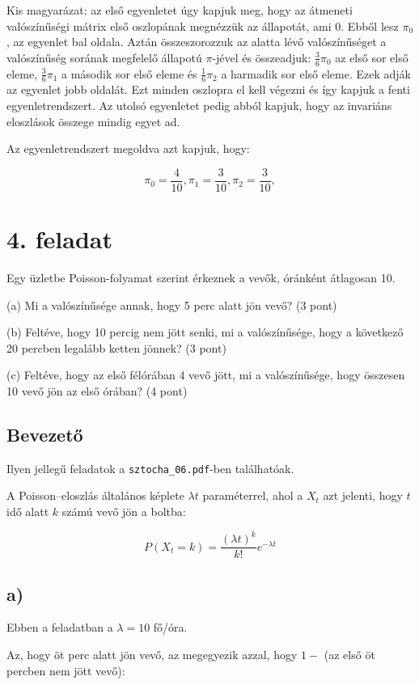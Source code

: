 \documentclass[a4paper,12pt]{article}   		%
\begin{document}
Kis magyarázat: az első egyenletet úgy kapjuk meg, hogy az átmeneti
valószínűségi mátrix első oszlopának megnézzük az állapotát, ami 0.
Ebből lesz $\pi_0$, az egyenlet bal oldala. Aztán összeszorozzuk az 
alatta lévő valószínűséget a valószínűség sorának megfelelő állapotú
$\pi$-jével és összeadjuk: $\frac{3}{6} \pi_0$ az első sor első eleme,
$\frac{3}{6} \pi_1$ a második sor első eleme és $\frac{1}{6} \pi_2$
a harmadik sor első eleme. Ezek adják az egyenlet jobb oldalát.
Ezt minden oszlopra el kell végezni és így kapjuk a fenti 
egyenletrendszert. Az utolsó egyenletet pedig abból kapjuk, hogy az
invariáns eloszlások összege mindig egyet ad.

Az egyenletrendszert megoldva azt kapjuk, hogy:

\[
\pi_0 = \frac{4}{10},
\pi_1 = \frac{3}{10},
\pi_2 = \frac{3}{10},
\]

\pagebreak
\section*{4. feladat}
Egy üzletbe Poisson-folyamat szerint érkeznek a vevők, óránként 
átlagosan 10.

(a) Mi a valószínűsége annak, hogy 5 perc alatt jön vevő? (3 pont)

(b) Feltéve, hogy 10 percig nem jött senki, mi a valószínűsége, hogy a
következő 20 percben legalább ketten jönnek? (3 pont)

(c) Feltéve, hogy az első félórában 4 vevő jött, mi a valószínűsége, 
hogy összesen 10 vevő jön az első órában? (4 pont)

\subsection*{Bevezető}
Ilyen jellegű feladatok a \texttt{sztocha\_06.pdf}-ben találhatóak.

A Poisson--eloszlás általános képlete $\lambda t$ paraméterrel, ahol a
$X_t$ azt jelenti, hogy $t$ idő alatt $k$ számú vevő jön a boltba:

\[
P(X_t = k) = \frac{\left(\lambda t\right)^k}{k!}e^{-\lambda t} 
\]

\subsection*{a)}
Ebben a feladatban a $\lambda = 10$ fő/óra.

Az, hogy öt perc alatt jön vevő, az megegyezik azzal, hogy $1-$ (az első
öt percben nem jött vevő):
\end{document}

